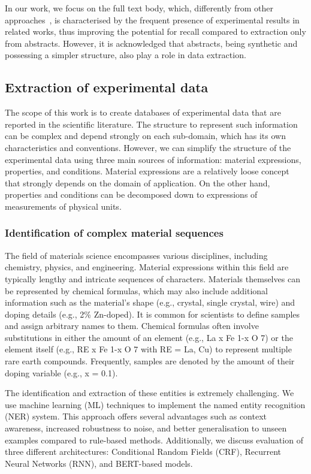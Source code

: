In our work, we focus on the full text body, which, differently from other approaches~\cite{yamaguchi-etal-2020-sc}, is characterised by the frequent presence of experimental results in related works, thus improving the potential for recall compared to extraction only from abstracts. 
However, it is acknowledged that abstracts, being synthetic and possessing a simpler structure, also play a role in data extraction.

\subsection{Extraction of experimental data}

The scope of this work is to create databases of experimental data that are reported in the scientific literature. 
The structure to represent such information can be complex and depend strongly on each sub-domain, which has its own characteristics and conventions. 
However, we can simplify the structure of the experimental data using three main sources of information: material expressions, properties, and conditions. 
Material expressions are a relatively loose concept that strongly depends on the domain of application. On the other hand, properties and conditions can be decomposed down to expressions of measurements of physical units. 

\subsubsection{Identification of complex material sequences}
The field of materials science encompasses various disciplines, including chemistry, physics, and engineering. 
Material expressions within this field are typically lengthy and intricate sequences of characters. Materials themselves can be represented by chemical formulas, which may also include additional information such as the material's shape (e.g., crystal, single crystal, wire) and doping details (e.g., 2\% Zn-doped). It is common for scientists to define samples and assign arbitrary names to them. Chemical formulas often involve substitutions in either the amount of an element (e.g., La x Fe 1-x O 7) or the element itself (e.g., RE x Fe 1-x O 7 with RE = La, Cu) to represent multiple rare earth compounds. Frequently, samples are denoted by the amount of their doping variable (e.g., x = 0.1).

The identification and extraction of these entities is extremely challenging. 
We use machine learning (ML) techniques to implement the named entity recognition (NER) system. This approach offers several advantages such as context awareness, increased robustness to noise, and better generalisation to unseen examples compared to rule-based methods. Additionally, we discuss evaluation of three different architectures: Conditional Random Fields (CRF), Recurrent Neural Networks (RNN), and BERT-based models.

